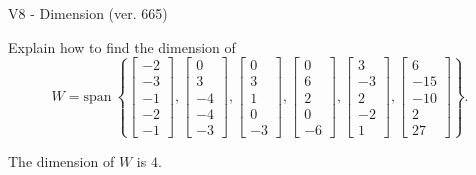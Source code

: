 \begin{exercise}
  \begin{exerciseTitle}V8 - Dimension (ver. 665)\end{exerciseTitle}
  \begin{exerciseStatement}
    Explain how to find the dimension of 
\[W=\mathrm{span}\ \left\{\left[\begin{array}{r}
-2 \\
-3 \\
-1 \\
-2 \\
-1
\end{array}\right] , \left[\begin{array}{r}
0 \\
3 \\
-4 \\
-4 \\
-3
\end{array}\right] , \left[\begin{array}{r}
0 \\
3 \\
1 \\
0 \\
-3
\end{array}\right] , \left[\begin{array}{r}
0 \\
6 \\
2 \\
0 \\
-6
\end{array}\right] , \left[\begin{array}{r}
3 \\
-3 \\
2 \\
-2 \\
1
\end{array}\right] , \left[\begin{array}{r}
6 \\
-15 \\
-10 \\
2 \\
27
\end{array}\right]\right\}.\]



  \end{exerciseStatement}
  \begin{exerciseAnswer}
   The dimension of \(W\) is  \(4\).
  


  \end{exerciseAnswer}
\end{exercise}